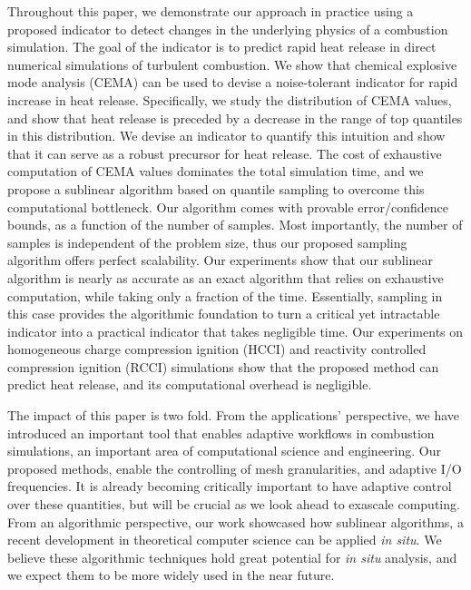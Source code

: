 \documentclass[final]{siamltex}
\begin{document}
Throughout this paper, we demonstrate our approach in practice using a proposed 
indicator to detect changes in the underlying physics of a combustion simulation.  
The goal of the indicator is to predict rapid heat release in direct numerical simulations of turbulent 
combustion. We show that chemical explosive mode analysis (CEMA) 
can be used to devise a noise-tolerant indicator for rapid increase in heat release.
Specifically,  we study the distribution of  CEMA values, and show that
heat release is preceded by a decrease in the range of  top quantiles in this
distribution.  We devise an indicator to quantify this intuition and show
that it can serve as a robust precursor for heat release. 
The cost of  exhaustive computation of CEMA values dominates  
the total simulation time, and we propose a sublinear algorithm based on
quantile sampling to overcome this computational bottleneck.  Our algorithm  
comes with provable error/confidence
bounds, as a function of the number of samples. Most importantly,  the number
of samples is independent of the problem size, thus our proposed sampling
algorithm offers perfect scalability.  Our experiments show that our
sublinear algorithm is  nearly as  accurate as  an exact algorithm  that relies
on exhaustive computation, while  taking only a fraction of the time.
Essentially,  sampling in this case  provides the algorithmic foundation to
turn a critical yet intractable indicator into a practical indicator that takes negligible time.   
Our experiments on homogeneous charge compression ignition (HCCI)  and reactivity controlled 
compression ignition (RCCI) simulations show that the proposed method can  predict heat release, 
and its computational overhead is negligible. 

The  impact of this paper is two fold. From the applications' perspective,
we have introduced an important  tool that enables adaptive workflows in 
combustion simulations, an important area of computational science and engineering.  
Our proposed methods, enable the controlling of mesh granularities, and adaptive I/O 
frequencies. It is already becoming critically important to have adaptive
control over these quantities, but will be crucial as we look
ahead to exascale computing. From an algorithmic perspective, our work showcased how sublinear 
algorithms, a recent development in  theoretical computer science can be
applied \emph{in situ}.  We believe these  algorithmic techniques hold great potential for 
\emph{in situ} analysis, and we expect them to be more widely used in the near future. 
\end{document}
